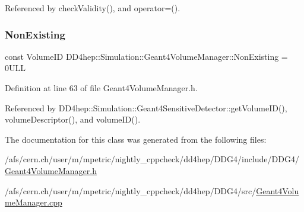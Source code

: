 Referenced by check\+Validity(), and operator=().

\hypertarget{class_d_d4hep_1_1_simulation_1_1_geant4_volume_manager_a21aa25818681febe8658db66aa94b89c}{}\label{class_d_d4hep_1_1_simulation_1_1_geant4_volume_manager_a21aa25818681febe8658db66aa94b89c} 
\subsubsection{\texorpdfstring{Non\+Existing}{NonExisting}}
{\footnotesize\ttfamily const Volume\+ID D\+D4hep\+::\+Simulation\+::\+Geant4\+Volume\+Manager\+::\+Non\+Existing = 0\+U\+LL\hspace{0.3cm}{\ttfamily [static]}}



Definition at line 63 of file Geant4\+Volume\+Manager.\+h.



Referenced by D\+D4hep\+::\+Simulation\+::\+Geant4\+Sensitive\+Detector\+::get\+Volume\+I\+D(), volume\+Descriptor(), and volume\+I\+D().



The documentation for this class was generated from the following files\+:\begin{DoxyCompactItemize}
\item 
/afs/cern.\+ch/user/m/mpetric/nightly\+\_\+cppcheck/dd4hep/\+D\+D\+G4/include/\+D\+D\+G4/\hyperlink{_geant4_volume_manager_8h}{Geant4\+Volume\+Manager.\+h}\item 
/afs/cern.\+ch/user/m/mpetric/nightly\+\_\+cppcheck/dd4hep/\+D\+D\+G4/src/\hyperlink{_geant4_volume_manager_8cpp}{Geant4\+Volume\+Manager.\+cpp}\end{DoxyCompactItemize}
